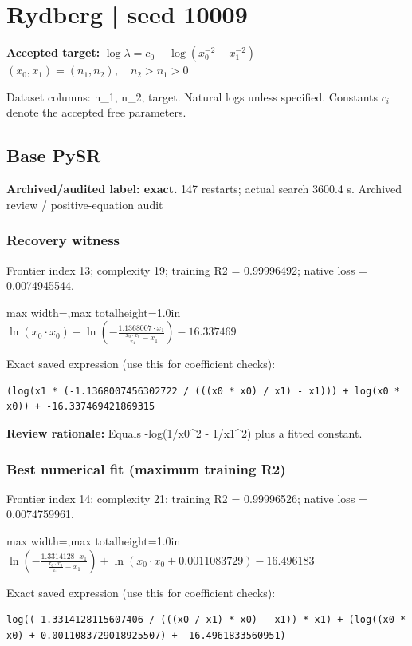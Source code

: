 \documentclass[10pt,letterpaper,landscape]{article}
\begin{document}
\section*{Rydberg | seed 10009}
\textbf{Accepted target:} $\displaystyle \log\lambda=c_0-\log\!\left(x_0^{-2}-x_1^{-2}\right)$\hfill $(x_0,x_1)=(n_1,n_2),\quad n_2>n_1>0$\par
{\small Dataset columns: n\_1, n\_2, target. Natural logs unless specified. Constants $c_i$ denote the accepted free parameters.}\par\medskip
\begin{minipage}[t]{0.485\textwidth}
\subsection*{Base PySR}
\textbf{Archived/audited label: exact.} 147 restarts; actual search 3600.4 s.
{\small Archived review / positive-equation audit}
\subsubsection*{Recovery witness}
Frontier index 13; complexity 19; training R2 = 0.99996492; native loss = 0.0074945544.
\begin{center}\begin{adjustbox}{max width=\linewidth,max totalheight=1.0in}$\displaystyle \ln{\left(x_{0} \cdot x_{0} \right)} + \ln{\left(- \frac{1.1368007 \cdot x_{1}}{\frac{x_{0} \cdot x_{0}}{x_{1}} - x_{1}} \right)} - 16.337469$\end{adjustbox}\end{center}
{\scriptsize Exact saved expression (use this for coefficient checks):}
\begin{lstlisting}
(log(x1 * (-1.1368007456302722 / (((x0 * x0) / x1) - x1))) + log(x0 * x0)) + -16.337469421869315
\end{lstlisting}
{\small\textbf{Review rationale:} Equals -log(1/x0\textasciicircum{}2 - 1/x1\textasciicircum{}2) plus a fitted constant.}
\subsubsection*{Best numerical fit (maximum training R2)}
Frontier index 14; complexity 21; training R2 = 0.99996526; native loss = 0.0074759961.
\begin{center}\begin{adjustbox}{max width=\linewidth,max totalheight=1.0in}$\displaystyle \ln{\left(- \frac{1.3314128 \cdot x_{1}}{\frac{x_{0} \cdot x_{0}}{x_{1}} - x_{1}} \right)} + \ln{\left(x_{0} \cdot x_{0} + 0.0011083729 \right)} - 16.496183$\end{adjustbox}\end{center}
{\scriptsize Exact saved expression (use this for coefficient checks):}
\begin{lstlisting}
log((-1.3314128115607406 / (((x0 / x1) * x0) - x1)) * x1) + (log((x0 * x0) + 0.0011083729018925507) + -16.4961833560951)
\end{lstlisting}
\end{minipage}\hfill
\end{document}
